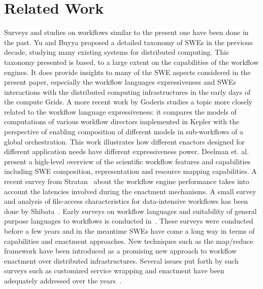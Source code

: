 \section{Related Work}
Surveys and studies on workflows similar to the present one have been done in
the past. Yu and Buyya \cite{yu-buyya:2005} proposed a detailed taxonomy of
SWEs in the previous decade, studying many existing systems for distributed
computing. This taxonomy presented is based, to a large extent on the
capabilities of the workflow engines. It does provide insights to many of the
SWE aspects considered in the present paper, especially the workflow languages
expressiveness and SWEs interactions with the distributed computing
infrastructures in the early days of the compute Grids. A more recent work by
Goderis \cite{goderis-brooks-etal:2009} studies a topic more closely related to
the workflow language expressiveness: it compares the models of computations of
various workflow directors implemented in Kepler
\cite{ludascher-altintas-etal:2005a} with the perspective of enabling
composition of different models in sub-workflows of a global orchestration.
This work illustrates how different enactors designed for different application
needs have different expressiveness power. Deelman et. al.
\cite{deelman-overview} present a high-level overview of the scientific
workflow features and capabilities including SWE composition, representation
and resource mapping capabilities. A recent survey from
Stratan~\cite{stratan-iosup-etal:2008} about the workflow engine performance
takes into account the latencies involved during the enactment mechanisms. A
small survey and analysis of file-access characteristics for data-intensive
workflows has been done by Shibata~\cite{Shibata}. Early surveys on workflow
languages and suitability of general purpose languages to workflows is
conducted in~\cite{generalpurpose}. These surveys were conducted before a few
years and in the meantime SWEs have come a long way in terms of capabilities
and enactment approaches. New techniques such as the map/reduce framework
\cite{mapreduce} have been introduced as a promising new approach to workflow
enactment over distributed infrastructures. Several issues put forth by such
surveys such as customized service wrapping and enactment have been adequately
addressed over the
years~\cite{glatard-montagnat-etal:2008a,rojasbalderrama-montagnat-etal:2010}.

